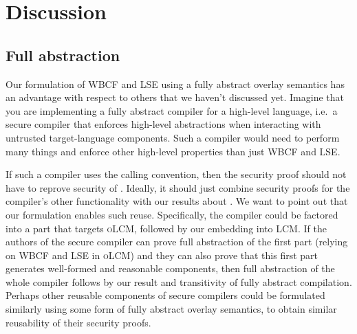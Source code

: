 \documentclass[acmsmall,review,showframe]{acmart}\settopmatter{printfolios=true,printccs=false,printacmref=false}
\newcommand{\trgcm}{\textsc{LCM}}
\newcommand{\srccm}{\textsc{oLCM}}
\begin{document}


\section{Discussion}
\label{sec:discussion}
\subsection{Full abstraction}
Our formulation of WBCF and LSE using a fully abstract overlay semantics has an advantage with respect to others that we haven't discussed yet.
Imagine that you are implementing a fully abstract compiler for a high-level language, i.e.\ a secure compiler that enforces high-level abstractions when interacting with untrusted target-language components.
Such a compiler would need to perform many things and enforce other high-level properties than just WBCF and LSE.

If such a compiler uses the \stktokens{} calling convention, then the security proof should not have to reprove security of \stktokens{}.
Ideally, it should just combine security proofs for the compiler's other functionality with our results about \stktokens{}.
We want to point out that our formulation enables such reuse.
Specifically, the compiler could be factored into a part that targets \srccm{}, followed by our embedding into \trgcm{}.
If the authors of the secure compiler can prove full abstraction of the first part (relying on WBCF and LSE in \srccm{}) and they can also prove that this first part generates well-formed and reasonable components, then full abstraction of the whole compiler follows by our result and transitivity of fully abstract compilation.
Perhaps other reusable components of secure compilers could be formulated similarly using some form of fully abstract overlay semantics, to obtain similar reusability of their security proofs.
\end{document}
